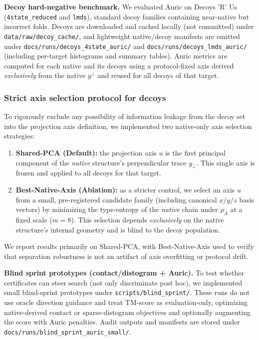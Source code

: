 \textbf{Decoy hard-negative benchmark.} We evaluated Auric on Decoys 'R' Us (\texttt{4state\_reduced} and \texttt{lmds}), standard decoy families containing near-native but incorrect folds. Decoys are downloaded and cached locally (not committed) under \texttt{data/raw/decoy\_cache/}, and lightweight native/decoy manifests are emitted under \texttt{docs/runs/decoys\_4state\_auric/} and \texttt{docs/runs/decoys\_lmds\_auric/} (including per-target histograms and summary tables). Auric metrics are computed for each native and its decoys using a protocol-fixed axis derived \emph{exclusively} from the native $y^\perp$ and reused for all decoys of that target.

\subsubsection*{Strict axis selection protocol for decoys}
To rigorously exclude any possibility of information leakage from the decoy set into the projection axis definition, we implemented two native-only axis selection strategies:
\begin{enumerate}
    \item \textbf{Shared-PCA (Default):} the projection axis $u$ is the first principal component of the \textit{native} structure's perpendicular trace $y_{\perp}$. This single axis is frozen and applied to all decoys for that target.
    \item \textbf{Best-Native-Axis (Ablation):} as a stricter control, we select an axis $u$ from a small, pre-registered candidate family (including canonical $x/y/z$ basis vectors) by minimizing the type-entropy of the \textit{native} chain under $\rho_A$ at a fixed scale ($m=8$). This selection depends \textit{exclusively} on the native structure's internal geometry and is blind to the decoy population.
\end{enumerate}
We report results primarily on Shared-PCA, with Best-Native-Axis used to verify that separation robustness is not an artifact of axis overfitting or protocol drift.

\textbf{Blind sprint prototypes (contact/distogram + Auric).} To test whether certificates can steer search (not only discriminate post hoc), we implemented small blind-sprint prototypes under \texttt{scripts/blind\_sprint/}. These runs do not use oracle direction guidance and treat TM-score as evaluation-only, optimizing native-derived contact or sparse-distogram objectives and optionally augmenting the score with Auric penalties. Audit outputs and manifests are stored under \texttt{docs/runs/blind\_sprint\_auric\_small/}.

